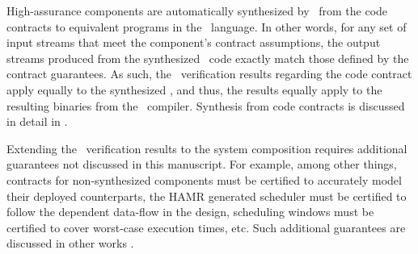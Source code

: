 High-assurance components are automatically synthesized by \splt\ from
the code contracts to equivalent programs in the \ckml\
language.
In other words, for any set of input streams that meet the
component's contract assumptions, the output streams produced from
the synthesized \ckml\ code exactly match those defined by the contract guarantees.
As such, the \agr\ verification results regarding the code contract apply equally to the synthesized \ckml, and thus, the results equally apply to the resulting binaries from the \ckml\ compiler.
Synthesis from code contracts is discussed in detail in \secref{sec:synthesis}.

Extending the \agr\ verification results to the system composition requires additional guarantees not discussed in this manuscript.
For example, among other things, contracts for non-synthesized components must be certified to accurately model their deployed counterparts, the HAMR generated scheduler must be certified to follow the dependent data-flow in the design, scheduling windows must be certified to cover worst-case execution times, etc.
Such additional guarantees are discussed in other works \cite{gearcase2020, dcrypps2019, 10.1007/978-3-030-89159-6_18, 10.1007/978-3-030-89159-6_17, sel4-2009, scheduled-agree, 9734792}.
